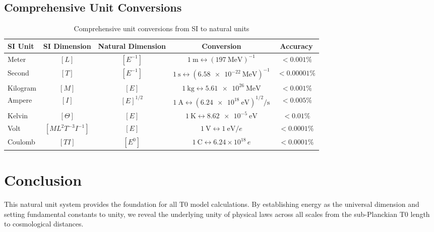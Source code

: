 \documentclass[11pt,a4paper]{article}
\begin{document}
	\subsection{Comprehensive Unit Conversions}
	
	\begin{table}[htbp]
		\centering
		\begin{adjustbox}{width=0.95\textwidth}
			\begin{tabular}{lcccc}
				\toprule
				\textbf{SI Unit} & \textbf{SI Dimension} & \textbf{Natural Dimension} & \textbf{Conversion} & \textbf{Accuracy} \\
				\midrule
				Meter & $[L]$ & $[E^{-1}]$ & $\SI{1}{\meter} \leftrightarrow (\SI{197}{\mega\electronvolt})^{-1}$ & $< 0.001\%$ \\
				Second & $[T]$ & $[E^{-1}]$ & $\SI{1}{\second} \leftrightarrow (\SI{6.58e-22}{\mega\electronvolt})^{-1}$ & $< 0.00001\%$ \\
				Kilogram & $[M]$ & $[E]$ & $\SI{1}{\kilogram} \leftrightarrow \SI{5.61e26}{\mega\electronvolt}$ & $< 0.001\%$ \\
				Ampere & $[I]$ & $[E]^{1/2}$ & $\SI{1}{\ampere} \leftrightarrow (\SI{6.24e18}{\electronvolt})^{1/2}/\si{\second}$ & $< 0.005\%$ \\
				Kelvin & $[\Theta]$ & $[E]$ & $\SI{1}{\kelvin} \leftrightarrow \SI{8.62e-5}{\electronvolt}$ & $< 0.01\%$ \\
				Volt & $[ML^2 T^{-3} I^{-1}]$ & $[E]$ & $\SI{1}{\volt} \leftrightarrow \SI{1}{\electronvolt}/e$ & $< 0.0001\%$ \\
				Coulomb & $[T I]$ & $[E^0]$ & $\SI{1}{\coulomb} \leftrightarrow 6.24 \times 10^{18} \, e$ & $< 0.0001\%$ \\
				\bottomrule
			\end{tabular}
		\end{adjustbox}
		\caption{Comprehensive unit conversions from SI to natural units}
		\label{tab:conversion}
	\end{table}
	
	\section{Conclusion}
	
	This natural unit system provides the foundation for all T0 model calculations. By establishing energy as the universal dimension and setting fundamental constants to unity, we reveal the underlying unity of physical laws across all scales from the sub-Planckian T0 length to cosmological distances.
	
\end{document}
